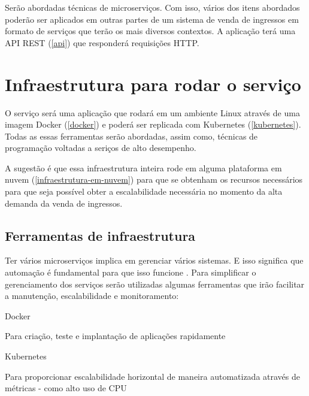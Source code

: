 Serão abordadas técnicas de microserviços.
Com isso, vários dos itens abordados poderão ser aplicados em outras partes de um sistema
de venda de ingressos em formato de serviços que terão os mais diversos contextos.
A aplicação terá uma API REST (\autoref{api}) que responderá requisições HTTP.

\section{Infraestrutura para rodar o serviço}

O serviço será uma aplicação que rodará em um ambiente Linux através
de uma imagem Docker (\autoref{docker})
e poderá ser replicada com Kubernetes (\autoref{kubernetes}).
Todas as essas ferramentas
serão abordadas, assim como, técnicas de programação voltadas a seriços de alto
desempenho.

A sugestão é que essa infraestrutura inteira rode em alguma plataforma em nuvem
(\autoref{infraestrutura-em-nuvem}) para que se obtenham os recursos necessários para que
seja possível obter a escalabilidade necessária no momento da alta demanda da
venda de ingressos.

\subsection{Ferramentas de infraestrutura}

Ter vários microserviços implica em gerenciar
vários sistemas. E isso significa que automação é fundamental para que isso funcione
\cite{martin-fowler-microservices}.
Para simplificar o gerenciamento dos serviços serão utilizadas algumas ferramentas que
irão facilitar a manutenção, escalabilidade e monitoramento:

\begin{alineas}

  \item Docker

  \begin{alineas}
     \item Para criação, teste e implantação de aplicações rapidamente \cite{aws-o-que-e-o-docker}
  \end{alineas}

  \item Kubernetes

  \begin{alineas}
     \item Para proporcionar escalabilidade horizontal de maneira automatizada através de métricas
           - como alto uso de CPU \cite{kubernetes-horizontal-pod-autoscaling}
  \end{alineas}

\end{alineas}

